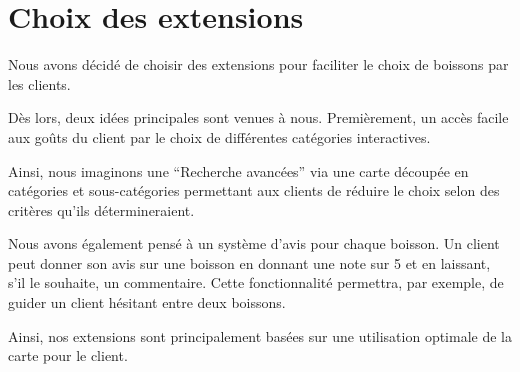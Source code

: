 

\section{Choix des extensions}
Nous avons décidé de choisir des extensions pour faciliter
le choix de boissons par les clients.

Dès lors, deux idées principales sont venues à nous. 
Premièrement, un accès facile aux goûts du client par 
le choix de différentes catégories interactives.

Ainsi, nous imaginons une ``Recherche avancées'' via une carte 
découpée en catégories et sous-catégories permettant aux clients de
réduire le choix selon des critères qu'ils détermineraient. 

Nous avons également pensé à un système d'avis pour chaque boisson. 
Un client peut donner son avis sur une boisson en donnant une note
sur 5 et en laissant, s'il le souhaite, un commentaire. Cette
fonctionnalité permettra, par exemple, de guider un client hésitant
entre deux boissons.

Ainsi, nos extensions sont principalement basées sur une utilisation
optimale de la carte pour le client.

